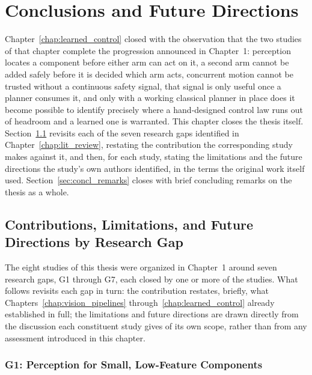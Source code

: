 \chapter{Conclusions and Future Directions}
\label{chap:conclusion}

Chapter~\ref{chap:learned_control} closed with the observation that the two studies of that chapter
complete the progression announced in Chapter~1: perception locates a component before either arm
can act on it, a second arm cannot be added safely before it is decided which arm acts, concurrent
motion cannot be trusted without a continuous safety signal, that signal is only useful once a
planner consumes it, and only with a working classical planner in place does it become possible to
identify precisely where a hand-designed control law runs out of headroom and a learned one is
warranted. This chapter closes the thesis itself. Section~\ref{sec:concl_bygap} revisits each of
the seven research gaps identified in Chapter~\ref{chap:lit_review}, restating the contribution the
corresponding study makes against it, and then, for each study, stating the limitations and the
future directions the study's own authors identified, in the terms the original work itself used.
Section~\ref{sec:concl_remarks} closes with brief concluding remarks on the thesis as a whole.

\section{Contributions, Limitations, and Future Directions by Research Gap}\label{sec:concl_bygap}

The eight studies of this thesis were organized in Chapter~1 around seven research gaps, G1 through
G7, each closed by one or more of the studies. What follows revisits each gap in turn: the
contribution restates, briefly, what Chapters~\ref{chap:vision_pipelines}
through~\ref{chap:learned_control} already established in full; the limitations and future
directions are drawn directly from the discussion each constituent study gives of its own scope,
rather than from any assessment introduced in this chapter.

\subsection{G1: Perception for Small, Low-Feature Components}\label{sec:concl_g1}

